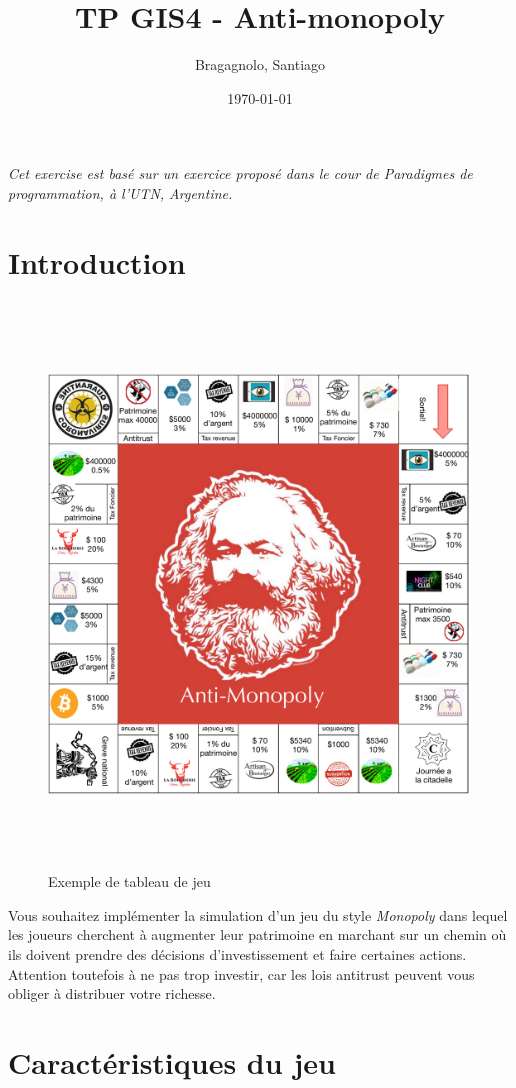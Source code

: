 \documentclass[12pt]{article}
\author{
        Bragagnolo, Santiago
}
\title{TP GIS4 - Anti-monopoly}
\date{\today}
\begin{document}
\maketitle
\emph{Cet exercise est basé sur un exercice proposé dans le cour de Paradigmes de programmation, à l'UTN, Argentine.}

\section{Introduction}

\begin{figure}
\includegraphics[width=15cm,height=15cm,keepaspectratio]{figures/board.pdf}
\caption{Exemple de tableau de jeu}
\label{fig:tableau}
\end{figure}

	Vous souhaitez implémenter la simulation d'un jeu du style \emph{Monopoly} dans lequel les joueurs cherchent
à augmenter leur patrimoine en marchant sur un chemin où ils doivent prendre des décisions 
d'investissement et faire certaines actions. Attention toutefois à ne pas trop investir, car 
les lois antitrust peuvent vous obliger à distribuer votre richesse.


\section{Caractéristiques du jeu}
\end{document}
